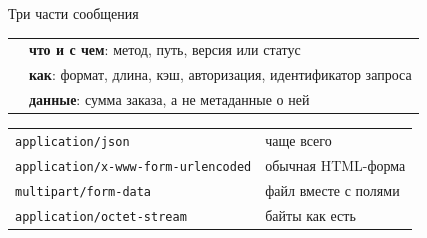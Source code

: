 \documentclass[aspectratio=169,10pt,t]{beamer}
\begin{document}
\begin{frame}{Три части сообщения}
  \slidetop
  {\renewcommand{\arraystretch}{1.4}
  \begin{tabular}{@{}L{3.6cm}L{9.2cm}@{}}
     & \textbf{что и с чем}: метод, путь, версия
      или статус \\
            & \textbf{как}: формат, длина, кэш,
      авторизация, идентификатор запроса \\
                 & \textbf{данные}: сумма заказа, а не
      метаданные о ней \\
  \end{tabular}}

  \slidegap
  \par\vspace{0.5em}
  {\renewcommand{\arraystretch}{1.1}\small
  \begin{tabular}{@{}L{6.8cm}L{6.0cm}@{}}
    \texttt{application/json}                  & чаще всего \\
    \texttt{application/x-www-form-urlencoded} & обычная HTML-форма \\
    \texttt{multipart/form-data}               & файл вместе с полями \\
    \texttt{application/octet-stream}          & байты как есть \\
  \end{tabular}}

  \slidegap
\end{frame}
\end{document}
